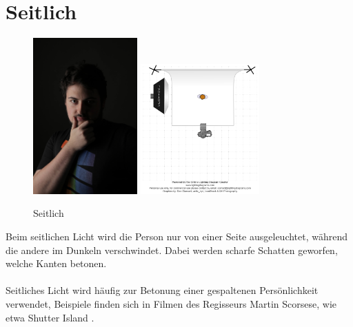 \documentclass{school}
\begin{document}
\section{Seitlich}
\begin{figure}[h]
	\centering
	\includegraphics[height=6cm]{2-seitlich.jpg}
	\includegraphics[height=5cm]{2-seitlich-diagram.png}
	\caption{Seitlich}
\end{figure}

Beim seitlichen Licht wird die Person nur von einer Seite ausgeleuchtet, während die andere im Dunkeln verschwindet. Dabei werden scharfe Schatten geworfen, welche Kanten betonen.
\\\\
Seitliches Licht wird häufig zur Betonung einer gespaltenen Persönlichkeit verwendet, Beispiele finden sich in Filmen des Regisseurs Martin Scorsese, wie etwa Shutter Island \cite{shutter-island}.
\end{document}
